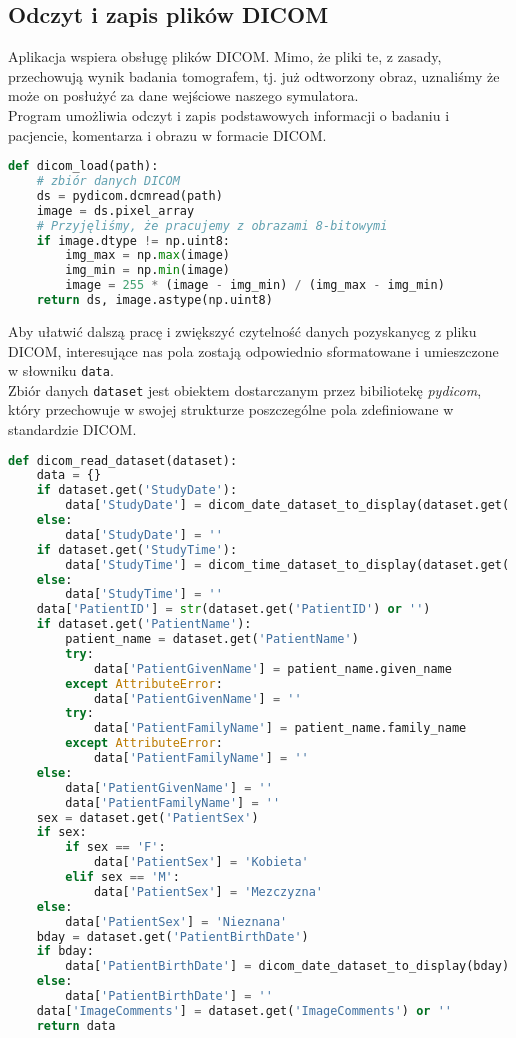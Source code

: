 \documentclass[a4paper]{article}
\begin{document}
\subsection{Odczyt i zapis plików DICOM}
Aplikacja wspiera obsługę plików DICOM. Mimo, że pliki te, z zasady, przechowują wynik badania tomografem, tj. już odtworzony obraz, uznaliśmy że może on posłużyć za dane wejściowe naszego symulatora.\\
Program umożliwia odczyt i zapis podstawowych informacji o badaniu i pacjencie, komentarza i obrazu w formacie DICOM.
\begin{lstlisting}[language=Python, caption=Wczytywanie plików DICOM, texcl=true]
def dicom_load(path):
    # zbiór danych DICOM
    ds = pydicom.dcmread(path)
    image = ds.pixel_array
    # Przyjęliśmy, że pracujemy z obrazami 8-bitowymi
    if image.dtype != np.uint8:
        img_max = np.max(image)
        img_min = np.min(image)
        image = 255 * (image - img_min) / (img_max - img_min)
    return ds, image.astype(np.uint8)
\end{lstlisting}
Aby ułatwić dalszą pracę i zwiększyć czytelność danych pozyskanycg z pliku DICOM, interesujące nas pola zostają odpowiednio sformatowane i umieszczone w słowniku \texttt{data}. \\
Zbiór danych \texttt{dataset} jest obiektem dostarczanym przez bibiliotekę \textit{pydicom}, który przechowuje w swojej strukturze poszczególne pola zdefiniowane w standardzie DICOM.
\begin{lstlisting}[language=Python, caption=Odczyt interesujących wartości ze zbioru danych DICOM, texcl=true]
def dicom_read_dataset(dataset):
    data = {}
    if dataset.get('StudyDate'):
        data['StudyDate'] = dicom_date_dataset_to_display(dataset.get('StudyDate'))
    else:
        data['StudyDate'] = ''
    if dataset.get('StudyTime'):
        data['StudyTime'] = dicom_time_dataset_to_display(dataset.get('StudyTime'))
    else:
        data['StudyTime'] = ''
    data['PatientID'] = str(dataset.get('PatientID') or '')
    if dataset.get('PatientName'):
        patient_name = dataset.get('PatientName')
        try:
            data['PatientGivenName'] = patient_name.given_name
        except AttributeError:
            data['PatientGivenName'] = ''
        try:
            data['PatientFamilyName'] = patient_name.family_name
        except AttributeError:
            data['PatientFamilyName'] = ''
    else:
        data['PatientGivenName'] = ''
        data['PatientFamilyName'] = ''
    sex = dataset.get('PatientSex')
    if sex:
        if sex == 'F':
            data['PatientSex'] = 'Kobieta'
        elif sex == 'M':
            data['PatientSex'] = 'Mezczyzna'
    else:
        data['PatientSex'] = 'Nieznana'
    bday = dataset.get('PatientBirthDate')
    if bday:
        data['PatientBirthDate'] = dicom_date_dataset_to_display(bday)
    else:
        data['PatientBirthDate'] = ''
    data['ImageComments'] = dataset.get('ImageComments') or ''
    return data
\end{lstlisting}
\end{document}
